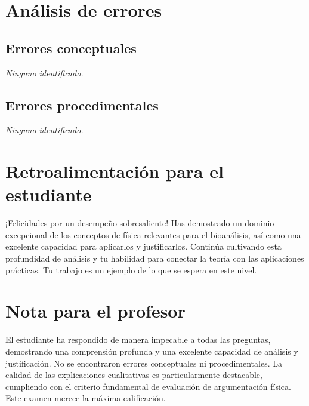\documentclass[11pt,a4paper]{article}
\begin{document}
\section*{Análisis de errores}

\subsection*{Errores conceptuales}
\textit{Ninguno identificado.}

\subsection*{Errores procedimentales}
\textit{Ninguno identificado.}

\section*{Retroalimentación para el estudiante}
\begin{tcolorbox}[cajaRecomendacion, title={Dirigido a: Anamerc Acuña}]
¡Felicidades por un desempeño sobresaliente! Has demostrado un dominio excepcional de los conceptos de física relevantes para el bioanálisis, así como una excelente capacidad para aplicarlos y justificarlos. Continúa cultivando esta profundidad de análisis y tu habilidad para conectar la teoría con las aplicaciones prácticas. Tu trabajo es un ejemplo de lo que se espera en este nivel.
\end{tcolorbox}

\section*{Nota para el profesor}
\begin{tcolorbox}[
  enhanced, breakable,
  colback=yellow!8, colframe=yellow!60!black,
  fonttitle=\bfseries, coltitle=black,
  title={Observaciones para revisión manual},
  top=4pt, bottom=4pt, left=8pt, right=8pt,
]
El estudiante ha respondido de manera impecable a todas las preguntas, demostrando una comprensión profunda y una excelente capacidad de análisis y justificación. No se encontraron errores conceptuales ni procedimentales. La calidad de las explicaciones cualitativas es particularmente destacable, cumpliendo con el criterio fundamental de evaluación de argumentación física. Este examen merece la máxima calificación.
\end{tcolorbox}
\end{document}
